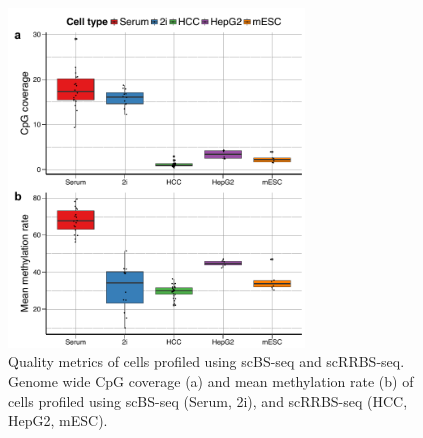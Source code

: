 \begin{figure}[htbp!]
\centering
\includegraphics[width=0.7\textwidth]{cells}
\caption[Quality metrics of cells profiled using scBS-seq and scRRBS-seq.]{Quality metrics of cells profiled using scBS-seq and scRRBS-seq. Genome wide CpG coverage (a) and mean methylation rate (b) of cells profiled using scBS-seq (Serum, 2i), and scRRBS-seq (HCC, HepG2, mESC).}
\label{fig:dcpg_eval_cells}
\end{figure}

